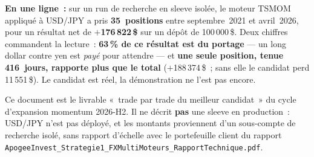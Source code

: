 \documentclass[11pt, a4paper]{scrartcl}
\begin{document}
\vspace{0.8cm}

\begin{thesisbox}
\textbf{En une ligne~:} sur un run de recherche en sleeve isolée, le moteur
TSMOM appliqué à USD/JPY a pris \textbf{35~positions} entre septembre~2021 et
avril~2026, pour un résultat net de \textbf{$+$176\,822\,\$} sur un dépôt de
100\,000\,\$. Deux chiffres commandent la lecture~: \textbf{63\,\% de ce
résultat est du portage} --- un long dollar contre yen est \emph{payé} pour
attendre --- et \textbf{une seule position, tenue 416~jours, rapporte plus que
le total} ($+$188\,374\,\$~; sans elle le candidat perd 11\,551\,\$). Le
candidat est réel, la démonstration ne l'est pas encore.
\end{thesisbox}

\vspace{0.4cm}

{\small\color{slateGrey}\sffamily
Ce document est le livrable «~trade par trade du meilleur candidat~» du cycle
d'expansion momentum 2026-H2. Il ne décrit \textbf{pas} une sleeve en
production~: USD/JPY n'est pas déployé, et les montants proviennent d'un
sous-compte de recherche isolé, sans rapport d'échelle avec le portefeuille
client du rapport \texttt{ApogeeInvest\_Strategie1\_FXMultiMoteurs\_RapportTechnique.pdf}.}

\clearpage

\tableofcontents
\clearpage










\end{document}
